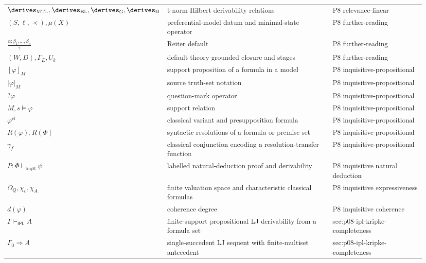 \begin{longtable}{@{}p{}p{}p{}@{}}
\(\derives_{\mathrm{MTL}},\allowbreak \derives_{\mathrm{BL}},\allowbreak \derives_G,\allowbreak \derives_{\Pi}\) & t-norm Hilbert derivability relations & P8 relevance-\allowbreak{}linear \\
\((S,\allowbreak \ell,\allowbreak \prec),\allowbreak \mu(X)\) & preferential-model datum and minimal-state operator & P8 further-\allowbreak{}reading \\
\(\frac{\alpha:\beta_1,\ldots,\beta_n}{\gamma}\) & Reiter default & P8 further-\allowbreak{}reading \\
\((W,\allowbreak D),\allowbreak \Gamma_E,\allowbreak U_k\) & default theory grounded closure and stages & P8 further-\allowbreak{}reading \\
\([\varphi]_M\) & support proposition of a formula in a model & P8 inquisitive-\allowbreak{}propositional \\
\(|\varphi|_M\) & source truth-set notation & P8 inquisitive-\allowbreak{}propositional \\
\(?\varphi\) & question-mark operator & P8 inquisitive-\allowbreak{}propositional \\
\(M,\allowbreak s\models\varphi\) & support relation & P8 inquisitive-\allowbreak{}propositional \\
\(\varphi^{\mathrm{cl}}\) & classical variant and presupposition formula & P8 inquisitive-\allowbreak{}propositional \\
\(R(\varphi),\allowbreak R(\Phi)\) & syntactic resolutions of a formula or premise set & P8 inquisitive-\allowbreak{}propositional \\
\(\gamma_f\) & classical conjunction encoding a resolution-transfer function & P8 inquisitive-\allowbreak{}propositional \\
\(P:\Phi\vdash_{\mathrm{InqB}}\psi\) & labelled natural-deduction proof and derivability & P8 inquisitive natural deduction \\
\(\Omega_Q,\allowbreak \chi_v,\allowbreak \chi_A\) & finite valuation space and characteristic classical formulas & P8 inquisitive expressiveness \\
\(d(\varphi)\) & coherence degree & P8 inquisitive coherence \\
\(\Gamma\vdash_{\mathsf{IPL}}A\) & finite-support propositional LJ derivability from a formula set & sec:\allowbreak{}p08-\allowbreak{}ipl-\allowbreak{}kripke-\allowbreak{}completeness \\
\(\Gamma_0\Rightarrow A\) & single-succedent LJ sequent with finite-multiset antecedent & sec:\allowbreak{}p08-\allowbreak{}ipl-\allowbreak{}kripke-\allowbreak{}completeness \\

\end{longtable}
